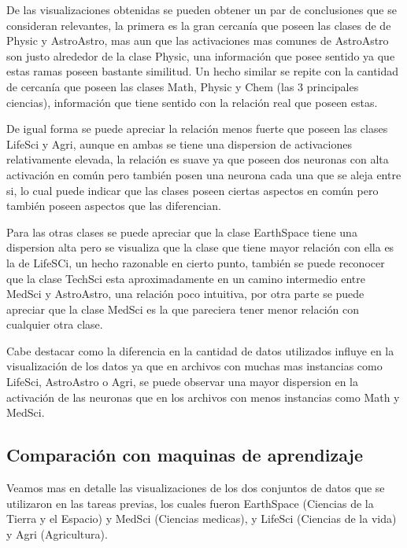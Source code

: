 \documentclass{article}
\theoremstyle{mytheoremstyle}
\theoremstyle{mytheoremstyle}
\theoremstyle{myproblemstyle}
\begin{document}
\newpage

De las visualizaciones obtenidas se pueden obtener un par de conclusiones que se consideran relevantes, la primera es la gran cercanía que poseen las clases de de Physic y AstroAstro, mas aun que las activaciones mas comunes de AstroAstro son justo alrededor de la clase Physic, una información que posee sentido ya que estas ramas poseen bastante similitud. Un hecho similar se repite con la cantidad de cercanía que poseen las clases Math, Physic y Chem (las 3 principales ciencias), información que tiene sentido con la relación real que poseen estas.

De igual forma se puede apreciar la relación menos fuerte que poseen las clases LifeSci y Agri, aunque en ambas se tiene una dispersion de activaciones relativamente elevada, la relación es suave ya que poseen dos neuronas con alta activación en común pero también posen una neurona cada una que se aleja entre si, lo cual puede indicar que las clases poseen ciertas aspectos en común pero también poseen aspectos que las diferencian.

Para las otras clases se puede apreciar que la clase EarthSpace tiene una dispersion alta pero se visualiza que la clase que tiene mayor relación con ella es la de LifeSCi, un hecho razonable en cierto punto, también se puede reconocer que la clase TechSci esta aproximadamente en un camino intermedio entre MedSci y AstroAstro, una relación poco intuitiva, por otra parte se puede apreciar que la clase MedSci es la que pareciera tener menor relación con cualquier otra clase.

Cabe destacar como la diferencia en la cantidad de datos utilizados influye en la visualización de los datos ya que en archivos con muchas mas instancias como LifeSci, AstroAstro o Agri, se puede observar una mayor dispersion en la activación de las neuronas que en los archivos con menos instancias como Math y MedSci.

\subsection*{Comparación con maquinas de aprendizaje}

Veamos mas en detalle las visualizaciones de los dos conjuntos de datos que se utilizaron en las tareas previas, los cuales fueron EarthSpace (Ciencias de la Tierra y el Espacio) y MedSci (Ciencias medicas), y LifeSci (Ciencias de la vida) y Agri (Agricultura).
\end{document}
